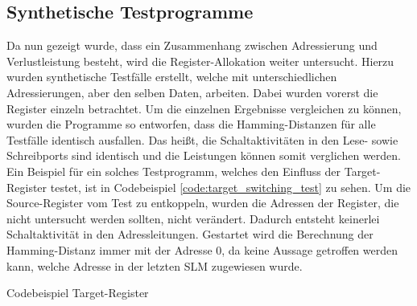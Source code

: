 \subsection{Synthetische Testprogramme}
Da nun gezeigt wurde, dass ein Zusammenhang zwischen Adressierung und Verlustleistung besteht, wird die Register-Allokation weiter untersucht. Hierzu wurden synthetische Testfälle erstellt, welche mit unterschiedlichen Adressierungen, aber den selben Daten, arbeiten. Dabei wurden vorerst die Register einzeln betrachtet. Um die einzelnen Ergebnisse vergleichen zu können, wurden die Programme so entworfen, dass die Hamming-Distanzen für alle Testfälle identisch ausfallen. Das heißt, die Schaltaktivitäten in den Lese- sowie Schreibports sind identisch und die Leistungen können somit verglichen werden. Ein Beispiel für ein solches Testprogramm, welches den Einfluss der Target-Register testet, ist in Codebeispiel \ref{code:target_switching_test} zu sehen. Um die Source-Register vom Test zu entkoppeln, wurden die Adressen der Register, die nicht untersucht werden sollten, nicht verändert. Dadurch entsteht keinerlei Schaltaktivität in den Adressleitungen. Gestartet wird die Berechnung der Hamming-Distanz immer mit der Adresse 0, da keine Aussage getroffen werden kann, welche Adresse in der letzten SLM zugewiesen wurde.

\begin{algorithm}[H]
	\begin{algorithmic}[1]
		\caption{Codebeispiel Target-Register }
		\label{code:target_switching_test}
	\end{algorithmic}
\end{algorithm}

